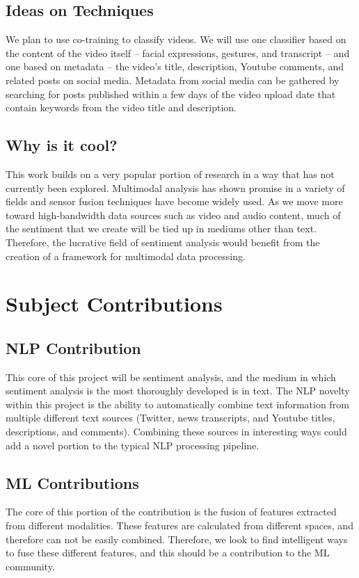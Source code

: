 \documentclass[paper=a4, fontsize=11pt]{scrartcl} %
\begin{document}
\subsection{Ideas on Techniques}

We plan to use co-training to classify videos.
We will use one classifier based on the content of the video itself -- facial expressions, gestures, and transcript -- and one based on metadata -- the video's title, description, Youtube comments, and related posts on social media.
Metadata from social media can be gathered by searching for posts published within a few days of the video upload date that contain keywords from the video title and description.

\subsection{Why is it cool?}
This work builds on a very popular portion of research in a way that has not currently been explored. 
Multimodal analysis has shown promise in a variety of fields and sensor fusion techniques have become widely used.
As we move more toward high-bandwidth data sources such as video and audio content, much of the sentiment that we create will be tied up in mediums other than text.
Therefore, the lucrative field of sentiment analysis would benefit from the creation of a framework for multimodal data processing.

\section{Subject Contributions}
\subsection{NLP Contribution}
This core of this project will be sentiment analysis, and the medium in which sentiment analysis is the most thoroughly developed is in text.
The NLP novelty within this project is the ability to automatically combine text information from multiple different text sources (Twitter, news transcripts, and Youtube titles, descriptions, and comments).
Combining these sources in interesting ways could add a novel portion to the typical NLP processing pipeline.

\subsection{ML Contributions}
The core of this portion of the contribution is the fusion of features extracted from different modalities.
These features are calculated from different spaces, and therefore can not be easily combined.
Therefore, we look to find intelligent ways to fuse these different features, and this should be a contribution to the ML community.
\end{document}
